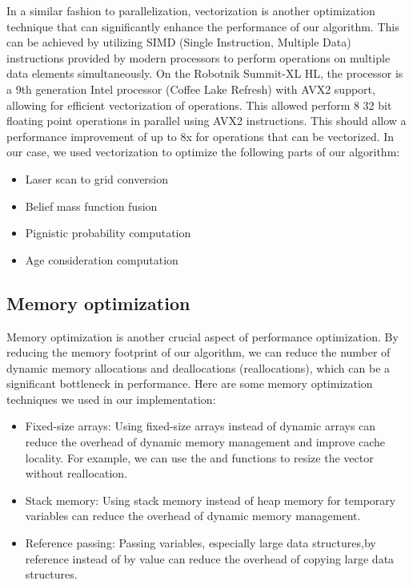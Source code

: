 In a similar fashion to parallelization, vectorization is another optimization technique that can significantly enhance the performance of our algorithm.
This can be achieved by utilizing SIMD (Single Instruction, Multiple Data) instructions provided by modern processors to perform operations on multiple data elements simultaneously.
On the Robotnik Summit-XL HL, the processor is a 9th generation Intel processor (Coffee Lake Refresh) with AVX2 support, allowing for efficient vectorization of operations.
This allowed perform 8 32 bit floating point operations in parallel using AVX2 instructions.
This should allow a performance improvement of up to 8x for operations that can be vectorized.
In our case, we used vectorization to optimize the following parts of our algorithm:
\begin{itemize}
    \item Laser scan to grid conversion
    \item Belief mass function fusion
    \item Pignistic probability computation
    \item Age consideration computation
\end{itemize}

\subsection{Memory optimization}

Memory optimization is another crucial aspect of performance optimization.
By reducing the memory footprint of our algorithm, we can reduce the number of dynamic memory allocations and deallocations (reallocations), which can be a significant bottleneck in performance.
Here are some memory optimization techniques we used in our implementation:
\begin{itemize}
    \item Fixed-size arrays: Using fixed-size arrays instead of dynamic arrays can reduce the overhead of dynamic memory management and improve cache locality.
          For example, we can use the \todo and \todo functions to resize the vector without reallocation.
    \item Stack memory: Using stack memory instead of heap memory for temporary variables can reduce the overhead of dynamic memory management.
    \item Reference passing: Passing variables, especially large data structures,by reference instead of by value can reduce the overhead of copying large data structures.
\end{itemize}
